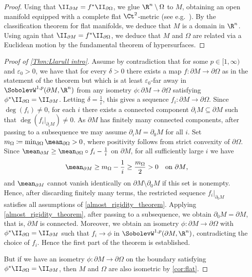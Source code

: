\documentclass[a4paper,11pt]{amsart}
\numberwithin{equation}{section}
\begin{document}
\begin{proof}
    Using that \(\II_{\partial M} = f^\ast \II_{\partial\Omega}\), we glue $\R^n\setminus\Omega$ to $M$, obtaining an open manifold equipped with a complete flat $\Ct^2$-metric (see e.g.~\cite[Lemma~4.1]{shi-tam-manifolds-with-boundary}).
    By the classification theorem for flat manifolds, we deduce that $M$ is a domain in $\R^n$.
    Using again that \(\II_{\partial M} = f^\ast \II_{\partial \Omega}\), we deduce that $M$ and $\Omega$ are related via a Euclidean motion by the fundamental theorem of hypersurfaces.
\end{proof}

\begin{proof}[Proof of \cref{Thm:Llarull intro}]
    Assume by contradiction that for some \(p \in [1,\infty)\) and \(\varepsilon_0 > 0\), we have that for every \(\delta > 0\) there exists a map \(f \colon \partial M \to \partial \Omega\) as in the statement of the theorem but which is at least \(\varepsilon_0\)-far away in \(\SobolevW^{1,p}(\partial M, \R^n)\) from any isometry \(\phi \colon \partial M \to \partial \Omega\) satisfying \(\phi^\ast \II_{\partial \Omega} = \II_{\partial M}\).
    Letting \(\delta = \frac{1}{i}\), this gives a sequence \(f_i \colon \partial M \to \partial \Omega\).
    Since \(\deg(f_i)\neq 0\), for each \(i\) there exists a connected component \(\partial_i M \subseteq \partial M\) such that \(\deg(f_i|_{\partial_i M}) \neq 0\).
    As \(\partial M\) has finitely many connected components, after passing to a subsequence we may assume \(\partial_i M = \partial_0 M\) for all \(i\).
    Set \(m_\Omega \coloneqq \min_{\partial\Omega}\mean_{\partial\Omega} > 0\), where positivity follows from strict convexity of \(\partial\Omega\).
    Since \(\mean_{\partial M} \geq \mean_{\partial\Omega}\circ f_i - \frac{1}{i}\) on \(\partial M\), for all sufficiently large \(i\) we have
    \[
        \mean_{\partial M} \geq m_\Omega - \frac{1}{i} \geq \frac{m_\Omega}{2} > 0 \quad \text{on \(\partial M\),}
    \]
    and \(\mean_{\partial M}\) cannot vanish identically on \(\partial M\setminus\partial_0 M\) if this set is nonempty.
    Hence, after discarding finitely many terms, the restricted sequence \(f_i|_{\partial_0 M}\) satisfies all assumptions of \cref{almost_rigidity_theorem}.
    Applying \cref{almost_rigidity_theorem}, after passing to a subsequence, we obtain \(\partial_0 M = \partial M\), that is, \(\partial M\) is connected.
    Moreover, we obtain an isometry \(\phi \colon \partial M \to \partial \Omega\) with \(\phi^\ast \II_{\partial \Omega} = \II_{\partial M}\) such that \(f_i \to \phi\) in \(\SobolevW^{1,p}(\partial M,\R^n)\), contradicting the choice of \(f_i\).
    Hence the first part of the theorem is established.
    
    But if we have an isometry \(\phi \colon \partial M \to \partial \Omega\) on the boundary satisfying \(\phi^\ast \II_{\partial \Omega} = \II_{\partial M}\), then \(M\) and \(\Omega\) are also isometric by \cref{cor:flat}.
\end{proof}
\end{document}

